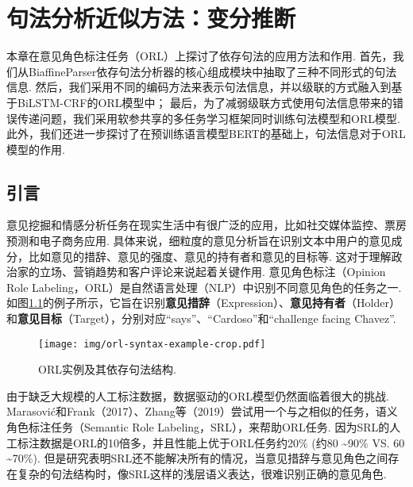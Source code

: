 \chapter{句法分析近似方法：变分推断}\label{cha:approximate-vi}
本章在意见角色标注任务（ORL）上探讨了依存句法的应用方法和作用.
首先，我们从BiaffineParser依存句法分析器的核心组成模块中抽取了三种不同形式的句法信息.
然后，我们采用不同的编码方法来表示句法信息，并以级联的方式融入到基于BiLSTM-CRF的ORL模型中；
最后，为了减弱级联方式使用句法信息带来的错误传递问题，我们采用软参共享的多任务学习框架同时训练句法模型和ORL模型.
此外，我们还进一步探讨了在预训练语言模型BERT的基础上，句法信息对于ORL模型的作用.

\section{引言}
意见挖掘和情感分析任务在现实生活中有很广泛的应用，比如社交媒体监控、票房预测和电子商务应用. 具体来说，细粒度的意见分析旨在识别文本中用户的意见成分，比如意见的措辞、意见的强度、意见的持有者和意见的目标等. 这对于理解政治家的立场、营销趋势和客户评论来说起着关键作用. 意见角色标注（Opinion Role Labeling，ORL）是自然语言处理（NLP）中识别不同意见角色的任务之一. 如图\ref{fig:example-syntax}的例子所示，它旨在识别\textbf{意见措辞}（Expression）、\textbf{意见持有者}（Holder）和\textbf{意见目标}（Target），分别对应“says”、“Cardoso”和“challenge facing Chavez”.

\begin{figure}[hb]
    \centering
    \texttt{[image: img/orl-syntax-example-crop.pdf]}
    \caption{ORL实例及其依存句法结构. }
    \label{fig:example-syntax}
\end{figure}

由于缺乏大规模的人工标注数据，数据驱动的ORL模型仍然面临着很大的挑战. Marasovi{\'c}和Frank（2017）、Zhang等（2019）尝试用一个与之相似的任务，语义角色标注任务（Semantic Role Labeling，SRL），来帮助ORL任务. 因为SRL的人工标注数据是ORL的10倍多，并且性能上优于ORL任务约20\% (约80 \textasciitilde 90\% VS. 60 \textasciitilde 70\%). 但是研究表明SRL还不能解决所有的情况，当意见措辞与意见角色之间存在复杂的句法结构时，像SRL这样的浅层语义表达，很难识别正确的意见角色.


